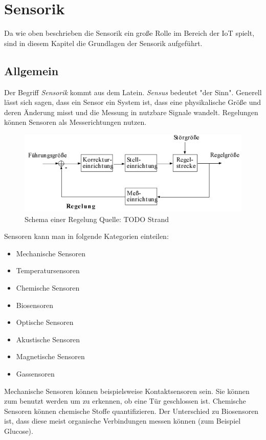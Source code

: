 \section{Sensorik}
Da wie oben beschrieben die Sensorik ein große Rolle im Bereich der IoT spielt, sind in diesem Kapitel die Grundlagen der Sensorik aufgeführt.  
\subsection{Allgemein}
Der Begriff \textit{Sensorik} kommt aus dem Latein. \textit{Sensus} bedeutet "der Sinn". Generell lässt sich sagen, dass ein Sensor ein System ist, dass eine physikalische Größe und deren Änderung misst und die Messung in nutzbare Signale wandelt. 
Regelungen können Sensoren als Messerichtungen nutzen.  

\begin{figure}
\includegraphics[scale=0.3
]{bilder/regelung} 
\caption{Schema einer Regelung Quelle: TODO Strand}
\label{IPv4}
\end{figure}

Sensoren kann man in folgende Kategorien einteilen:
\begin{itemize}
\item Mechanische Sensoren
\item Temperatursensoren 
\item Chemische Sensoren
\item Biosensoren
\item Optische Sensoren 
\item Akustische Sensoren
\item Magnetische Sensoren 
\item Gassensoren
\end{itemize}

Mechanische Sensoren können beispielsweise Kontaktsensoren sein. Sie können zum benutzt werden um zu erkennen, ob eine Tür geschlossen ist. Chemische Sensoren können chemische Stoffe quantifizieren. Der Unterschied zu Biosensoren ist, dass diese meist organische Verbindungen messen können (zum Beispiel Glucose). 

